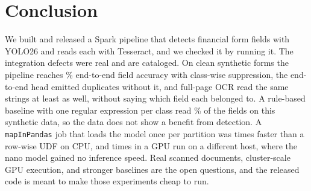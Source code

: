 \section{Conclusion}
We built and released a Spark pipeline that detects financial form fields with YOLO26 and reads each with Tesseract, and we checked it by running it. The integration defects were real and are cataloged. On clean synthetic forms the pipeline reaches \valNmsEndToEnd\% end-to-end field accuracy with class-wise suppression, the end-to-end head emitted duplicates without it, and full-page OCR read the same strings at least as well, without saying which field each belonged to. A rule-based baseline with one regular expression per class read \valRuleAcc\% of the fields on this synthetic data, so the data does not show a benefit from detection. A \texttt{mapInPandas} job that loads the model once per partition was \valPatPartSixteenSpeedup{} times faster than a row-wise UDF on CPU, and \valGpuPatPartSixteenSpeedup{} times in a GPU run on a different host, where the nano model gained no inference speed. Real scanned documents, cluster-scale GPU execution, and stronger baselines are the open questions, and the released code is meant to make those experiments cheap to run.
